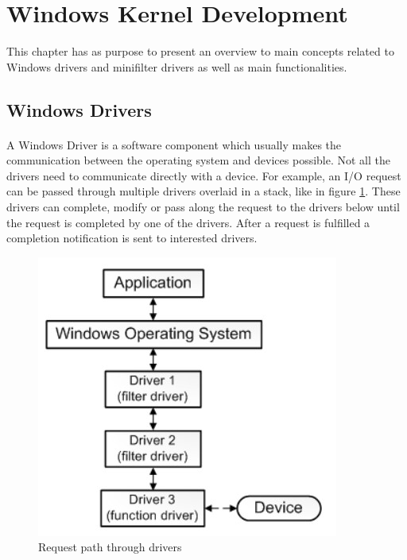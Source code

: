	
	
	\newpage
	\section{Windows Kernel Development}
		This chapter has as purpose to present an overview to main concepts related to Windows drivers and minifilter drivers as well as main functionalities.
	
		\subsection{Windows Drivers}
		\paragraph{}
		A Windows Driver is a software component which usually makes the communication between the operating system and devices possible. Not all the drivers need to communicate directly with a device. For example, an I/O request can be passed through multiple drivers overlaid in a stack, like in figure \ref{fig:drivers}. These drivers can complete, modify or pass along the request to the drivers below until the request is completed by one of the drivers. After a request is fulfilled a completion notification is sent to interested drivers\cite{MSDNWhatIsADriver}.
		
		
		\begin{figure}[h!]
			\begin{center}
				\includegraphics{images/Drivers.jpg}
				\caption{Request path through drivers\cite{MSDNWhatIsADriver}}
				\label{fig:drivers}
			\end{center}
		\end{figure}
